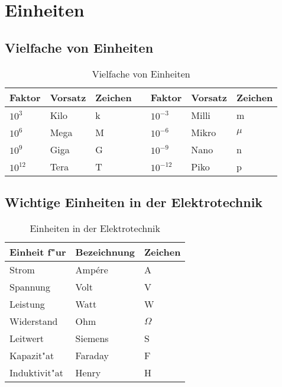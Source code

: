 \documentclass[german, 10pt, a4paper, headsepline]{scrreprt}
\theoremstyle{remark}
\begin{document}
\appendix

\chapter{Einheiten}


\section{Vielfache von Einheiten}

\begin{table}[htb]
	\renewcommand{\arraystretch}{1.3}
	\begin{center}
	\begin{tabular}{lllp{2cm}lll}
		Faktor &	Vorsatz &	Zeichen &	&	Faktor &	Vorsatz &	Zeichen\\ \hline

		$10^3$ &	Kilo &		k &		&	$10^{-3}$ &	Milli &		m\\
		$10^6$ &	Mega &		M &		&	$10^{-6}$ &	Mikro &		$\mu$\\
		$10^9$ &	Giga &		G &		&	$10^{-9}$ &	Nano &		n\\
		$10^{12}$ &	Tera &		T &		&	$10^{-12}$ &	Piko &		p
	\end{tabular}
	\end{center}
	\caption{Vielfache von Einheiten}
\end{table}

\section{Wichtige Einheiten in der Elektrotechnik}
\begin{table}[htb]
	\renewcommand{\arraystretch}{1.3}
	\begin{center}
	\begin{tabular}{lll}
		Einheit f"ur &		Bezeichnung &	Zeichen\\ \hline

		Strom &			Amp\'ere &	A\\
		Spannung &		Volt &		V\\
		Leistung &		Watt &		W\\
		Widerstand &		Ohm &		$\Omega$\\
		Leitwert &		Siemens &	S\\
		Kapazit"at &		Faraday &	F\\
		Induktivit"at &		Henry &		H
	\end{tabular}
	\end{center}
	\caption{Einheiten in der Elektrotechnik}
\end{table}
\end{document}
